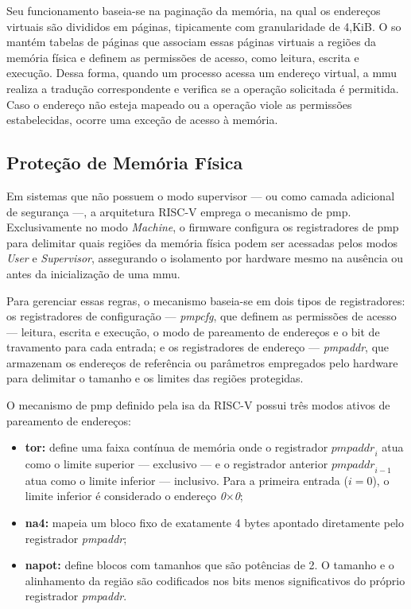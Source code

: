 Seu funcionamento baseia-se na paginação da memória, na qual os endereços virtuais são divididos em páginas, tipicamente com granularidade de 4,KiB. O \gls{so}
mantém tabelas de páginas que associam essas páginas virtuais a regiões da memória física e definem as permissões de acesso, como leitura, escrita e execução.
Dessa forma, quando um processo acessa um endereço virtual, a \gls{mmu} realiza a tradução correspondente e verifica se a operação solicitada é permitida.
Caso o endereço não esteja mapeado ou a operação viole as permissões estabelecidas, ocorre uma exceção de acesso à memória.

\subsection{Proteção de Memória Física}

Em sistemas que não possuem o modo supervisor --- ou como camada adicional de segurança ---, a arquitetura RISC-V emprega o mecanismo de \gls{pmp}.
Exclusivamente no modo \textit{Machine}, o firmware configura os registradores de \gls{pmp} para delimitar quais regiões da memória física podem ser acessadas pelos modos
\textit{User} e \textit{Supervisor}, assegurando o isolamento por hardware mesmo na ausência ou antes da inicialização de uma \gls{mmu}.

Para gerenciar essas regras, o mecanismo baseia-se em dois tipos de registradores: os registradores de configuração --- \textit{pmpcfg}, que definem as permissões de
acesso --- leitura, escrita e execução, o modo de pareamento de endereços e o bit de travamento para cada entrada; e os registradores de endereço --- \textit{pmpaddr},
que armazenam os endereços de referência ou parâmetros empregados pelo hardware para delimitar o tamanho e os limites das regiões protegidas.

O mecanismo de \gls{pmp} definido pela \gls{isa} da RISC-V possui três modos ativos de pareamento de endereços:

\begin{itemize}
    \item \textbf{\gls{tor}:} define uma faixa contínua de memória onde o registrador $\textit{pmpaddr}_i$ atua como o limite superior --- exclusivo --- e
        o registrador anterior $\textit{pmpaddr}_{i-1}$ atua como o limite inferior --- inclusivo. Para a primeira entrada ($i=0$), o limite inferior é considerado o
        endereço \textit{0$\times$0};
    \item \textbf{\gls{na4}:} mapeia um bloco fixo de exatamente 4 bytes apontado diretamente pelo registrador \textit{pmpaddr};
    \item \textbf{\gls{napot}:} define blocos com tamanhos que são potências de 2. O tamanho e o alinhamento da região são codificados nos bits menos significativos do próprio registrador \textit{pmpaddr}.
\end{itemize}


